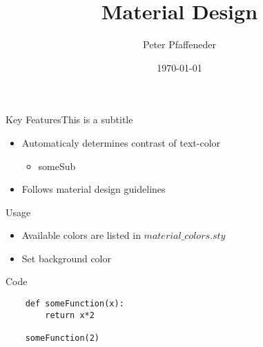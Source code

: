 \documentclass{beamer}
\title{Material Design}
\date{\today}
\author{Peter Pfaffeneder}
\begin{document}
\begin{frame}
	\titlepage
\end{frame}

\begin{frame}{Key Features}{This is a subtitle}

	\begin{itemize}
		\item Automaticaly determines contrast of text-color
		\begin{itemize}
			\item someSub
		\end{itemize}
		\item Follows material design guidelines
	\end{itemize}
\end{frame}

\begin{frame}{Usage}
	\begin{itemize}
		\item Available colors are listed in $material\_colors.sty$
		\item Set background color
	\end{itemize}
\end{frame}

\begin{frame}[fragile=singleslide]{Code}
	\begin{lstlisting}
	def someFunction(x):
		return x*2

	someFunction(2)
	\end{lstlisting}
\end{frame}
\end{document}
